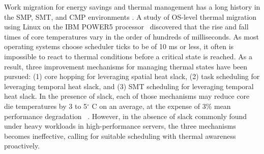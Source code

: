 Work migration for energy savings and thermal management has a long
history in the SMP, SMT, and CMP environments
\cite{Yao1995,Gomaa2004,Kumar2006,Yang2008}.  A study of OS-level
thermal migration using Linux on the IBM POWER5
processor~\cite{Choi2007} discovered that the rise and fall times of
core temperatures vary in the order of hundreds of milliseconds.  As
most operating systems choose scheduler ticks to be of 10 ms or less, it
often is impossible to react to thermal conditions before a critical
state is reached.  As a result, three improvement mechanisms for
managing thermal states have been pursued: (1) core hopping for
leveraging spatial heat slack, (2) task scheduling for leveraging
temporal heat slack, and (3) SMT scheduling for leveraging temporal heat
slack.  In the presence of slack, each of those mechanisms may reduce
core die temperatures by 3 to 5$^{\circ}$ C on an average, at the
expense of 3\% mean performance degradation ~\cite{Choi2007,Ayoub2009}.
However, in the absence of slack commonly found under heavy workloads in
high-performance servers, the three mechanisms becomes ineffective,
calling for suitable scheduling with thermal awareness proactively.


